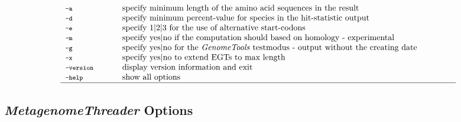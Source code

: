 \documentclass[12pt,titlepage]{article}
\newcommand{\MetagenomeThreader}{\textit{MetagenomeThreader}\xspace}
\newcommand{\GenomeTools}{\textit{GenomeTools}\xspace}
\begin{document}
\begin{table}[htbp]
\begin{footnotesize}
\[\begin{tabular}{p{2cm}p{14cm}}
\\
\Showoption{a}& specify minimum length of the amino acid sequences in the result
\\
\Showoption{d}& specify minimum percent-value for species in the hit-statistic output
\\
\Showoption{e}& specify 1$|$2$|$3 for the use of alternative start-codons
\\
\Showoption{m}& specify yes$|$no if the computation should based on homology - experimental
\\
\Showoption{g}& specify yes$|$no for the \GenomeTools testmodus - output without the creating date
\\
\Showoption{x}& specify yes$|$no to extend EGTs to max length
\\
\Showoption{version}& display version information and exit
\\
\Showoption{help}& show all options
\\
\hline
\end{tabular}
%
\]
\end{footnotesize}
\label{overviewOpt}
\end{table}

\subsection{\MetagenomeThreader Options}
\end{document}
